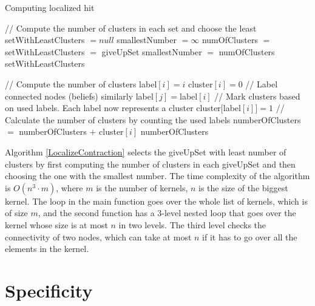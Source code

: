 \begin{algorithm}
\caption{Computing localized hit}
\label{LocalizeContraction}
\begin{algorithmic}[1]
\State // Compute the number of clusters in each set and choose the least
\State setWithLeastClusters $= null$
\State smallestNumber $= \infty$
\State numOfClusters $=$ 
\State setWithLeastClusters $=$ giveUpSet
\State smallestNumber $=$ numOfClusters
\EndIf
\EndFor
\State \Return setWithLeastClusters
\EndFunction
\end{algorithmic}


\begin{algorithmic}[1]
\State // Compute the number of clusters
\State label$[i]=i$
\EndFor
{}
\State cluster$[i]=0$
\EndFor
\State // Label connected nodes (beliefs) similarly
\State label$[j] = $label$[i]$
\EndIf
\EndFor
\EndFor
\State // Mark clusters based on used labels. Each label now represents a cluster
\State cluster$[$label$[i]]=1$
\EndFor
\State // Calculate the number of clusters by counting the used labels
\State numberOfClusters $=$ numberOfClusters $+$ cluster$[i]$
\EndFor 
\State \Return numberOfClusters
\EndFunction
\end{algorithmic}
\end{algorithm}

Algorithm \ref{LocalizeContraction} selects the giveUpSet with least number of clusters by first computing the number of clusters in each giveUpSet and then choosing the one with the smallest number. The time complexity of the algorithm is $O(n^3 \cdot m)$, where $m$ is the number of kernels, $n$ is the size of the biggest kernel. The loop in the main function goes over the whole list of kernels, which is of size $m$, and the second function has a 3-level nested loop that goes over the kernel whose size is at most $n$ in two levels. The third level checks the connectivity of two nodes, which can take at most $n$ if it has to go over all the elements in the kernel.

\section{Specificity}

